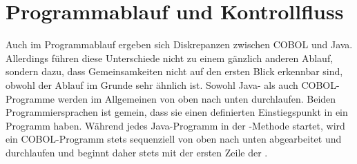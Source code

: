 \section{Programmablauf und Kontrollfluss}
Auch im Pro\-gramm\-ab\-lauf ergeben sich Diskrepanzen zwischen COBOL und Java. Allerdings führen diese Unterschiede nicht zu einem gänzlich anderen Ablauf, sondern dazu, dass Gemeinsamkeiten nicht auf den ersten Blick erkennbar sind, obwohl der Ablauf im Grunde sehr ähnlich ist. Sowohl Java- als auch COBOL-Programme werden im Allgemeinen von oben nach unten durchlaufen. Beiden Programmiersprachen ist gemein, dass sie einen definierten Einstiegspunkt in ein Programm haben. Während jedes Java-Programm in der -Methode startet, wird ein COBOL-Programm stets sequenziell von oben nach unten abgearbeitet und durchlaufen und beginnt daher stets mit der ersten Zeile der .


%





